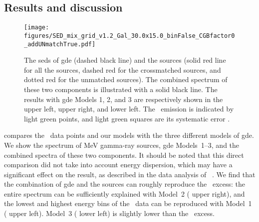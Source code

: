 \documentclass[a4paper,11pt]{article}
\begin{document}
\subsection{Results and discussion}
\label{sec:discussion}

\begin{figure}[ht!]
\centering
\texttt{[image: figures/SED\_mix\_grid\_v1.2\_Gal\_30.0x15.0\_binFalse\_CGBfactor0\_addUNmatchTrue.pdf]}
\caption{
The \acp{sed} of \ac{gde} (dashed black line) and
the sources (solid red line for all the sources, dashed red for the crossmatched sources, and dotted red for the unmatched sources).
The combined spectrum of these two components is illustrated with a solid black line.
The results with \ac{gde} Models 1, 2, and 3 are respectively shown in the upper left, upper right, and lower left.
The \comptel\ emission \citep{bouchet_diffuse_2011} is indicated by light green points, 
and light green squares are its systematic error \citep{strong_diffuse_1994}.
\label{fig:model}}
\end{figure}

 compares the \comptel\ data points and our models with the three different models of \ac{gde}.
We show the spectrum of MeV gamma-ray sources, \ac{gde} Models~1--3, and the combined spectra of these two components.
It should be noted that this direct comparison did not take into account energy dispersion, which may have a significant effect on the result, as described in the data analysis of \spi\ \citep{strong_gamma-ray_2005}.
%
We find that the combination of \ac{gde} and the sources can roughly reproduce the \comptel\ excess:
the entire spectrum can be sufficiently explained with Model~2 ( upper right), and
the lowest and highest energy bins of the \comptel\ data can be reproduced with Model~1 ( upper left).
Model~3 ( lower left) is slightly lower than the \comptel\ excess.
\end{document}
